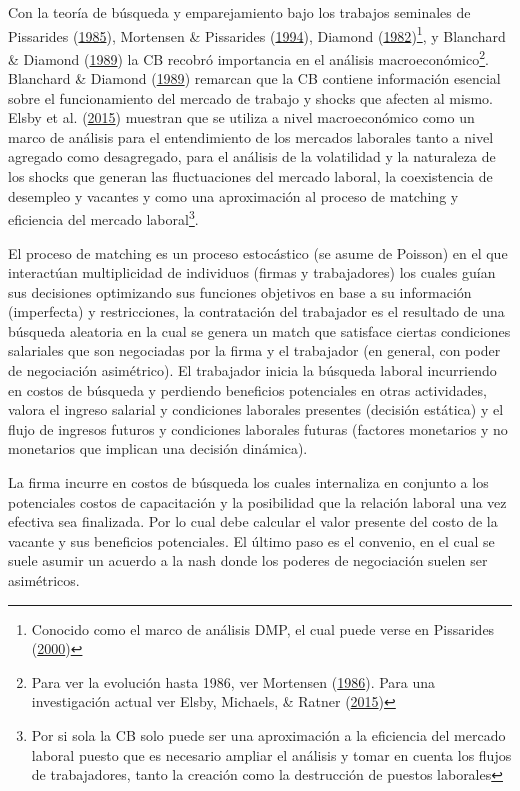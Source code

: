\documentclass[12pt,oneside]{reedthesis}
\begin{document}
Con la teoría de búsqueda y emparejamiento bajo los trabajos seminales de Pissarides (\protect\hyperlink{ref-Pissarides1985}{1985}), Mortensen \& Pissarides (\protect\hyperlink{ref-Mortensen1994}{1994}), Diamond (\protect\hyperlink{ref-Diamond1982}{1982})\footnote{Conocido como el marco de análisis DMP, el cual puede verse en Pissarides (\protect\hyperlink{ref-Pissarides2000}{2000})}, y Blanchard \& Diamond (\protect\hyperlink{ref-Blanchard1989}{1989}) la CB recobró importancia en el análisis macroeconómico\footnote{Para ver la evolución hasta 1986, ver Mortensen (\protect\hyperlink{ref-Mortensen1986}{1986}). Para una investigación actual ver Elsby, Michaels, \& Ratner (\protect\hyperlink{ref-Elsby2015}{2015})}. Blanchard \& Diamond (\protect\hyperlink{ref-Blanchard1989}{1989}) remarcan que la CB contiene información esencial sobre el funcionamiento del mercado de trabajo y shocks que afecten al mismo. Elsby et al. (\protect\hyperlink{ref-Elsby2015}{2015}) muestran que se utiliza a nivel macroeconómico como un marco de análisis para el entendimiento de los mercados laborales tanto a nivel agregado como desagregado, para el análisis de la volatilidad y la naturaleza de los shocks que generan las fluctuaciones del mercado laboral, la coexistencia de desempleo y vacantes y como una aproximación al proceso de matching y eficiencia del mercado laboral\footnote{Por si sola la CB solo puede ser una aproximación a la eficiencia del mercado laboral puesto que es necesario ampliar el análisis y tomar en cuenta los flujos de trabajadores, tanto la creación como la destrucción de puestos laborales}.

El proceso de matching es un proceso estocástico (se asume de Poisson) en el que interactúan multiplicidad de individuos (firmas y trabajadores) los cuales guían sus decisiones optimizando sus funciones objetivos en base a su información (imperfecta) y restricciones, la contratación del trabajador es el resultado de una búsqueda aleatoria en la cual se genera un match que satisface ciertas condiciones salariales que son negociadas por la firma y el trabajador (en general, con poder de negociación asimétrico). El trabajador inicia la búsqueda laboral incurriendo en costos de búsqueda y perdiendo beneficios potenciales en otras actividades, valora el ingreso salarial y condiciones laborales presentes (decisión estática) y el flujo de ingresos futuros y condiciones laborales futuras (factores monetarios y no monetarios que implican una decisión dinámica).

La firma incurre en costos de búsqueda los cuales internaliza en conjunto a los potenciales costos de capacitación y la posibilidad que la relación laboral una vez efectiva sea finalizada. Por lo cual debe calcular el valor presente del costo de la vacante y sus beneficios potenciales.
El último paso es el convenio, en el cual se suele asumir un acuerdo a la nash donde los poderes de negociación suelen ser asimétricos.
\end{document}

